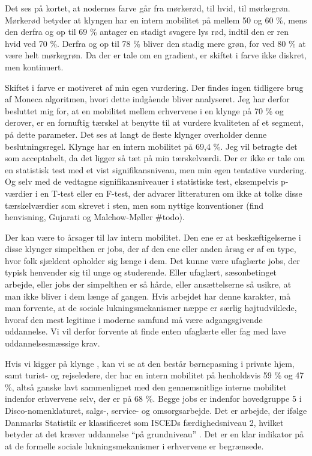 Det ses på kortet, at nodernes farve går fra mørkerød, til hvid, til mørkegrøn. Mørkerød betyder at klyngen har en intern mobilitet på mellem 50 og 60 \%, mens den derfra og op til 69 \% antager en stadigt svagere lys rød, indtil den er ren hvid ved 70 \%. Derfra og op til 78 \% bliver den stadig mere grøn, for ved 80 \% at være helt mørkegrøn. Da der er tale om en gradient, er skiftet i farve ikke diskret, men kontinuert. 

Skiftet i farve er motiveret af min egen vurdering. Der findes ingen tidligere brug af Moneca algoritmen, hvori dette indgående bliver analyseret. Jeg har derfor besluttet mig for, at en mobilitet mellem erhvervene i en klynge på 70 \% og derover, er en fornuftig tærskel at benytte til at  vurdere kvaliteten af et segment, på dette parameter. Det ses at langt de fleste klynger overholder denne beslutningsregel. Klynge  har en intern mobilitet på 69,4 \%. Jeg vil betragte det som acceptabelt, da det ligger så tæt på min tærskelværdi. Der er ikke er tale om en statistisk test med et vist signifikansniveau, men min egen tentative vurdering. Og selv med de vedtagne signifikansniveauer i statistiske test, eksempelvis p-værdier i en T-test eller en F-test,  der advarer litteraturen om ikke at tolke disse tærskelværdier som skrevet i sten, men som nyttige konventioner (find henvisning, Gujarati og Malchow-Møller \#todo). 

Der kan være to årsager til lav intern mobilitet. Den ene er at beskæftigelserne i disse klynger simpelthen er jobs, der af den ene eller anden årsag er af en type, hvor folk sjældent opholder sig længe i dem. Det kunne være ufaglærte jobs, der typisk henvender sig til unge og studerende. Eller ufaglært, sæsonbetinget arbejde, eller jobs der simpelthen er så hårde, eller ansættelserne så usikre, at man ikke bliver i dem længe af gangen. Hvis arbejdet har denne karakter, må man forvente, at de sociale lukningsmekanismer næppe er særlig højtudviklede, hvoraf den mest legitime i moderne samfund må være adgangsgivende uddannelse. Vi vil derfor forvente at finde enten ufaglærte eller fag med lave uddannelsesmæssige krav. 

Hvis vi kigger på klynge , kan vi se at den består børnepasning i private hjem, samt turist- og rejseledere, der har en intern mobilitet på henholdsvis  59 \% og 47 \%, altså ganske lavt sammenlignet med den gennemsnitlige interne mobilitet indenfor erhvervene selv, der er på 68 \%.  Begge jobs er indenfor hovedgruppe 5 i Disco-nomenklaturet, salgs-, service- og omsorgsarbejde. Det er arbejde, der ifølge Danmarks Statistik er klassificeret som ISCEDs færdighedsniveau 2, hvilket betyder at det kræver uddannelse “på grundniveau” \parencite[tabel 1]{DSTDISCO88}. Det er en klar indikator på at de formelle sociale lukningsmekanismer i erhvervene er begrænsede. 


